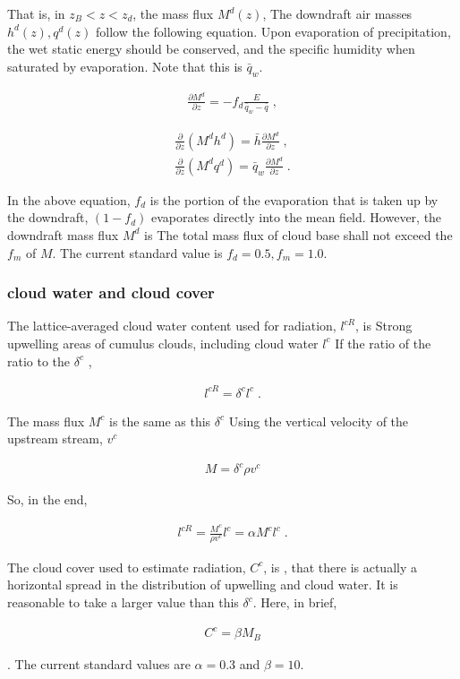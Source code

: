 That is, in \(z_B < z < z_d\), the mass flux \(M^d(z)\), The downdraft
air masses \(h^d(z),q^d(z)\) follow the following equation. Upon
evaporation of precipitation, the wet static energy should be conserved,
and the specific humidity when saturated by evaporation. Note that this
is \(\bar{q}_{w}\).

\begin{eqnarray}
  \frac{\partial M^d}{\partial z} =  - f_d \frac{E}{\bar{q}_{w}-\bar{q}} \;  ,
\end{eqnarray}

\begin{eqnarray}
  \frac{\partial }{\partial z} ( M^d h^d )  =  \bar{h}     \frac{\partial M^d}{\partial z} \; ,\\
  \frac{\partial }{\partial z} ( M^d q^d )  =  \bar{q}_{w} \frac{\partial M^d}{\partial z} \; .
\end{eqnarray}

In the above equation, \(f_d\) is the portion of the evaporation that is
taken up by the downdraft, \((1-f_d)\) evaporates directly into the mean
field. However, the downdraft mass flux \(M^d\) is The total mass flux
of cloud base shall not exceed the \(f_m\) of \(M\). The current
standard value is \(f_d=0.5, f_m=1.0\).

\hypertarget{cloud-water-and-cloud-cover}{%
\subsubsection{cloud water and cloud
cover}\label{cloud-water-and-cloud-cover}}

The lattice-averaged cloud water content used for radiation, \(l^{cR}\),
is Strong upwelling areas of cumulus clouds, including cloud water
\(l^c\) If the ratio of the ratio to the \(\delta^c\) ,

\begin{eqnarray}
  l^{cR} = \delta^c l^c \; .
\end{eqnarray}

The mass flux \(M^c\) is the same as this \(\delta^c\) Using the
vertical velocity of the upstream stream, \(v^c\)

\begin{eqnarray}
  M = \delta^c \rho v^c 
\end{eqnarray}

So, in the end,

\begin{eqnarray}
  l^{cR} = \frac{M^c}{\rho v^c} l^c = \alpha M^c l^c \; .
\end{eqnarray}

The cloud cover used to estimate radiation, \(C^c\), is , that there is
actually a horizontal spread in the distribution of upwelling and cloud
water. It is reasonable to take a larger value than this \(\delta^c\).
Here, in brief,

\begin{eqnarray}
  C^c = \beta M_B
\end{eqnarray}

. The current standard values are \(\alpha=0.3\) and \(\beta=10\).
